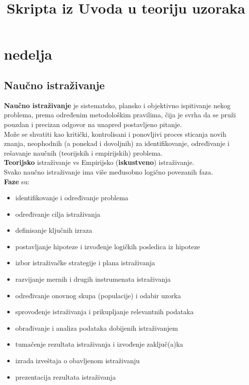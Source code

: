\documentclass[10pt,a4paper,]{article}
\title{Skripta iz Uvoda u teoriju uzoraka}
\begin{document}
\maketitle
\tableofcontents
\newpage

\section{nedelja}
\subsection{Naučno istraživanje}
\textbf{Naučno istraživanje} je sistematsko, plansko i objektivno ispitivanje nekog problema, prema određenim metodološkim pravilima, čija je svrha da se pruži pouzdan i precizan odgovor na unapred postavljeno pitanje.
\\[0.1cm]

Može se shvatiti kao kritički, kontrolisani i ponovljivi proces sticanja novih znanja, neophodnih (a ponekad i dovoljnih) za identifikovanje, određivanje i rešavanje naučnih (teorijskih i empirijskih) problema.
\\[0.1cm]

\textbf{Teorijsko} istraživanje vs Empirijsko (\textbf{iskustveno})
istraživanje.
\\[0.3cm]

Svako naučno istraživanje ima više međusobno logično povezanih faza. 
\\
\textbf{Faze} su:
\begin{itemize}
	\item identifikovanje i određivanje problema

	\item određivanje cilja istraživanja
	\item definisanje ključnih izraza
	\item postavljanje hipoteze i izvođenje logičkih posledica iz hipoteze
	\item izbor istraživačke strategije i plana istraživanja
	\item razvijanje mernih i drugih instrumenata istraživanja
	\item određivanje onovnog skupa (populacije) i odabir uzorka
	\item sprovođenje istraživanja i prikupljanje relevantnih podataka
	\item obrađivanje i analiza podataka dobijenih istraživanjem
	\item tumačenje rezultata istraživanja i izvođenje zaključ(a)ka
	\item izrada izveštaja o obavljenom istraživanju
	\item prezentacija rezultata istraživanja


\end{itemize}
\end{document}

